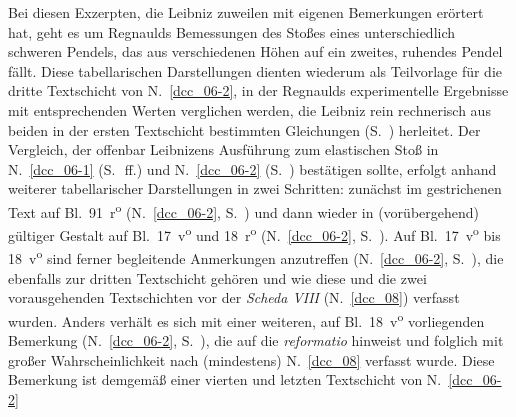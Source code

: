 Bei diesen Exzerpten, die Leibniz zuweilen mit eigenen Bemerkungen erörtert hat, geht es um Regnaulds%
\protect{}
Bemessungen des Stoßes eines unterschiedlich schweren Pendels, das aus verschiedenen Höhen auf ein zweites, ruhendes Pendel fällt.
Diese tabellarischen Darstellungen dienten wiederum als Teilvorlage für die dritte Textschicht von N.~\ref{dcc_06-2}, %
in der Regnaulds experimentelle Ergebnisse mit entsprechenden Werten verglichen werden, die Leibniz rein rechnerisch aus beiden in der ersten Textschicht bestimmten Gleichungen (S.~) herleitet.%
\protect{}
Der Vergleich, der offenbar Leibnizens Ausführung zum elastischen Stoß in N.~\ref{dcc_06-1} %
(S.~\,ff.) und N.~\ref{dcc_06-2} %
(S.~) bestätigen sollte, erfolgt anhand weiterer tabellarischer Darstellungen in zwei Schritten: zunächst im gestrichenen Text auf Bl.~91~r\textsuperscript{o} (N.~\ref{dcc_06-2}, %
S.~\pageref{LH_37_05_091r_gestrtab}\textendash\pageref{LH_37_05_091r_ende}) und dann wieder in (vorübergehend) gültiger Gestalt auf Bl.~17~v\textsuperscript{o} und 18~r\textsuperscript{o} (N.~\ref{dcc_06-2}, %
S.~\pageref{LH_35_09_23_017v_tab1}\textendash\pageref{LH_35_09_23_018r_tab2}).
Auf Bl.~17~v\textsuperscript{o} bis 18~v\textsuperscript{o} sind ferner begleitende Anmerkungen anzutreffen (N.~\ref{dcc_06-2}, %
S.~), die ebenfalls zur dritten Textschicht gehören und wie diese und die zwei vorausgehenden Textschichten vor der \textit{Scheda VIII} (N.~\ref{dcc_08}) %
verfasst wurden.
Anders verhält es sich mit einer weiteren, auf Bl.~18~v\textsuperscript{o} vorliegenden Bemerkung (N.~\ref{dcc_06-2}, %
S.~), die auf die \textit{reformatio} hinweist und folglich mit großer Wahrscheinlichkeit nach (mindestens) N.~\ref{dcc_08} %
verfasst wurde.
Diese Bemerkung ist demgemäß einer vierten und letzten Textschicht von N.~\ref{dcc_06-2} %
